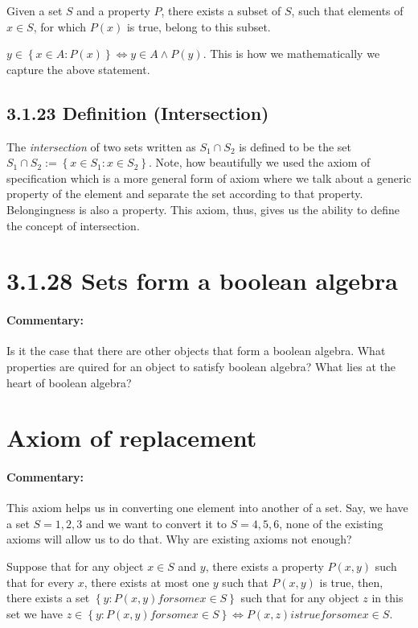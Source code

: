 \documentclass{report}
\begin{document}
Given a set $S$ and a property  $P$, there exists a subset of  $S$, such that elements of  $x \in S$, for which  $P(x)$ is true, belong to this subset.

$y \in \left\{ x \in A : P(x) \right\} \iff y \in A \land P(y) $. This is how we mathematically we capture the above statement. 

\subsection*{3.1.23 Definition (Intersection)}
The \textit{intersection} of two sets written as $S_1 \cap S_2$ is defined to be the set $S_1 \cap S_2 := \left\{ x \in S_1 : x \in S_2 \right\} $. Note, how beautifully we used the axiom of specification which is a more general form of axiom where we talk about a generic property of the element and separate the set according to that property. Belongingness is also a property. This axiom, thus, gives us the ability to define the concept of intersection.


\section*{3.1.28 Sets form a boolean algebra}
\paragraph{Commentary: }  Is it the case that there are other objects that form a boolean algebra. What properties are quired for an object to satisfy boolean algebra? What lies at the heart of boolean algebra?


\section{Axiom of replacement}
\paragraph{Commentary: } This axiom helps us in converting one element into another of a set. Say, we have a set $S = {1,2,3}$ and we want to convert it to  $S = {4,5,6}$, none of the existing axioms will allow us to do that. Why are existing axioms not enough?


Suppose that for any object $x \in S$ and  $y$, there exists a property  $P(x,y)$ such that for every  $x$, there exists at most one  $y$ such that  $P(x,y)$ is true, then, there exists a set $\left\{ y:P(x,y) for some x \in S\right\} $ such that for any object $z$ in this set we have  $z \in \left\{ y:P(x,y) for some x \in S \right\} \iff P(x,z) is true for some x \in S $. 
\end{document}
